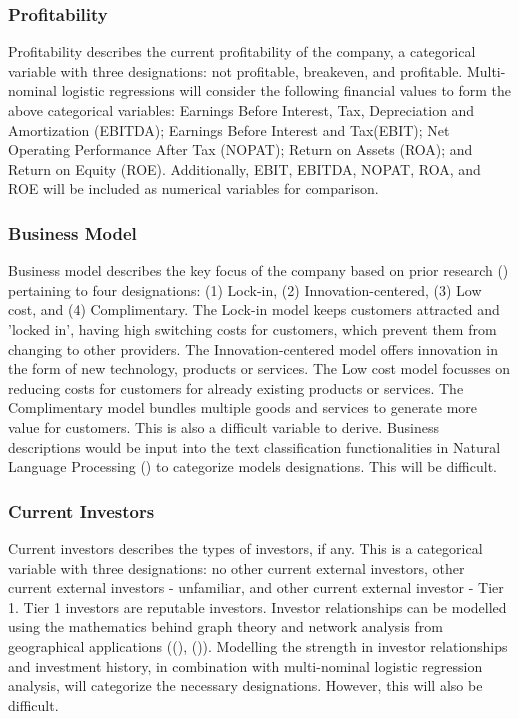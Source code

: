 \documentclass[12pt]{article}
\begin{document}
\subsubsection{Profitability}
Profitability describes the current profitability of the company, a categorical variable with three designations: not profitable, breakeven, and profitable.
Multi-nominal logistic regressions will consider the following financial values to form the above categorical variables: 
Earnings Before Interest, Tax, Depreciation and Amortization (EBITDA); 
Earnings Before Interest and Tax(EBIT);
Net Operating Performance After Tax (NOPAT);
Return on Assets (ROA);
and Return on Equity (ROE).
Additionally, EBIT, EBITDA, NOPAT, ROA, and ROE will be included as numerical variables for comparison.
\subsubsection{Business Model}
Business model describes the key focus of the company based on prior research (\cite{Amit2001493}) pertaining to four designations: (1) Lock-in, (2) Innovation-centered, (3) Low cost, and (4) Complimentary.
The Lock-in model keeps customers attracted and 'locked in', having high switching costs for customers, which prevent them from changing to other providers.
The Innovation-centered model offers innovation in the form of new technology, products or services.
The Low cost model focusses on reducing costs for customers for already existing products or services.
The Complimentary model bundles multiple goods and services to generate more value for customers.
This is also a difficult variable to derive.
Business descriptions would be input into the text classification functionalities in Natural Language Processing (\cite{NLP}) to categorize models designations.
This will be difficult.
\subsubsection{Current Investors}
Current investors describes the types of investors, if any.
This is a categorical variable with three designations: no other current external investors, other current external investors - unfamiliar, and other current external investor - Tier 1.
Tier 1 investors are reputable investors.
Investor relationships can be modelled using the mathematics behind graph theory and network analysis from geographical applications ((\cite{CURTIN2018153}), (\cite{FAUDREE200315})).
Modelling the strength in investor relationships and investment history, in combination with multi-nominal logistic regression analysis, will categorize the necessary designations.
However, this will also be difficult.
\end{document}
